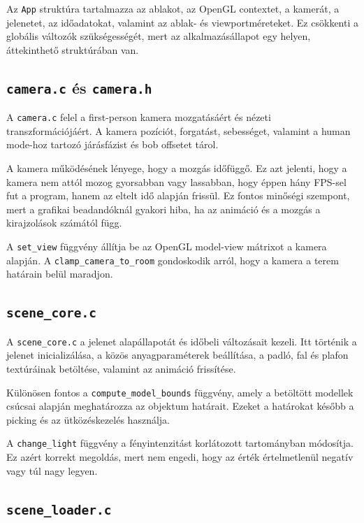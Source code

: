 \documentclass[12pt,a4paper]{article}
\newcommand{\code}[1]{\texttt{#1}}
\begin{document}
Az \code{App} struktúra tartalmazza az ablakot, az OpenGL contextet, a kamerát, a jelenetet, az időadatokat, valamint az ablak- és viewportméreteket. Ez csökkenti a globális változók szükségességét, mert az alkalmazásállapot egy helyen, áttekinthető struktúrában van.

\subsection{\code{camera.c} és \code{camera.h}}

A \code{camera.c} felel a first-person kamera mozgatásáért és nézeti transzformációjáért. A kamera pozíciót, forgatást, sebességet, valamint a human mode-hoz tartozó járásfázist és bob offsetet tárol.

A kamera működésének lényege, hogy a mozgás időfüggő. Ez azt jelenti, hogy a kamera nem attól mozog gyorsabban vagy lassabban, hogy éppen hány FPS-sel fut a program, hanem az eltelt idő alapján frissül. Ez fontos minőségi szempont, mert a grafikai beadandóknál gyakori hiba, ha az animáció és a mozgás a kirajzolások számától függ.

A \code{set\_view} függvény állítja be az OpenGL model-view mátrixot a kamera alapján. A \code{clamp\_camera\_to\_room} gondoskodik arról, hogy a kamera a terem határain belül maradjon.

\subsection{\code{scene\_core.c}}

A \code{scene\_core.c} a jelenet alapállapotát és időbeli változásait kezeli. Itt történik a jelenet inicializálása, a közös anyagparaméterek beállítása, a padló, fal és plafon textúráinak betöltése, valamint az animáció frissítése.

Különösen fontos a \code{compute\_model\_bounds} függvény, amely a betöltött modellek csúcsai alapján meghatározza az objektum határait. Ezeket a határokat később a picking és az ütközéskezelés használja.

A \code{change\_light} függvény a fényintenzitást korlátozott tartományban módosítja. Ez azért korrekt megoldás, mert nem engedi, hogy az érték értelmetlenül negatív vagy túl nagy legyen.

\subsection{\code{scene\_loader.c}}
\end{document}
